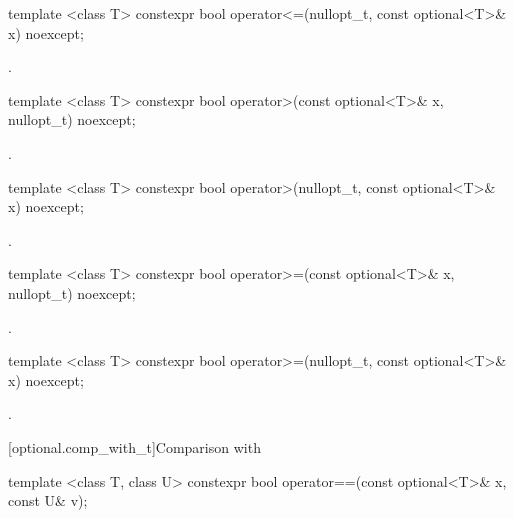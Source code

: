 %
\begin{itemdecl}
template <class T> constexpr bool operator<=(nullopt_t, const optional<T>& x) noexcept;
\end{itemdecl}

\begin{itemdescr}
\pnum
\returns
{}.
\end{itemdescr}

%
\begin{itemdecl}
template <class T> constexpr bool operator>(const optional<T>& x, nullopt_t) noexcept;
\end{itemdecl}

\begin{itemdescr}
\pnum
\returns
{}.
\end{itemdescr}

%
\begin{itemdecl}
template <class T> constexpr bool operator>(nullopt_t, const optional<T>& x) noexcept;
\end{itemdecl}

\begin{itemdescr}
\pnum
\returns
{}.
\end{itemdescr}

%
\begin{itemdecl}
template <class T> constexpr bool operator>=(const optional<T>& x, nullopt_t) noexcept;
\end{itemdecl}

\begin{itemdescr}
\pnum
\returns
{}.
\end{itemdescr}

%
\begin{itemdecl}
template <class T> constexpr bool operator>=(nullopt_t, const optional<T>& x) noexcept;
\end{itemdecl}

\begin{itemdescr}
\pnum
\returns
{}.
\end{itemdescr}

[optional.comp_with_t]{Comparison with }

%
\begin{itemdecl}
template <class T, class U> constexpr bool operator==(const optional<T>& x, const U& v);
\end{itemdecl}

